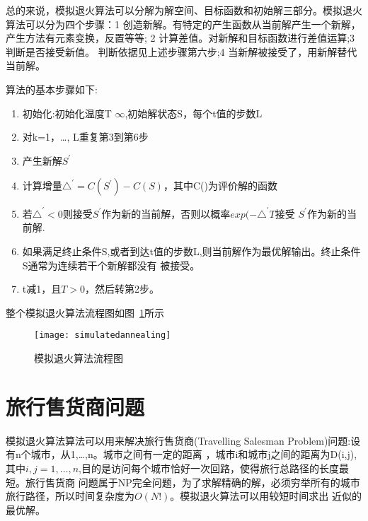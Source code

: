     总的来说，模拟退火算法可以分解为解空间、目标函数和初始解三部分。模拟退火算法可以分为四个步骤：1 创造新解。有特定的产生函数从当前解产生一个新解，产生方法有元素变换，反置等等; 2
计算差值。对新解和目标函数进行差值运算;3 判断是否接受新值。 判断依据见上述步骤第六步;4 当新解被接受了，用新解替代当前解。

    算法的基本步骤如下:
\begin{enumerate}
\item  初始化:初始化温度T $\infty$,初始解状态S，每个t值的步数L
\item  对k=1，\ldots, L重复第3到第6步
\item  产生新解$S^{'}$
\item  计算增量$\triangle^{'}=C(S^{'})-C(S)$，其中C()为评价解的函数
\item  若$\triangle^{'}<0$则接受$S^{'}$作为新的当前解，否则以概率$exp(-\triangle^{'}T$接受
$S^{'}$作为新的当前解.
\item  如果满足终止条件S,或者到达t值的步数L,则当前解作为最优解输出。终止条件S通常为连续若干个新解都没有
被接受。
\item  t减1，且$T>0$，然后转第2步。
\end{enumerate}

整个模拟退火算法流程图如图~\ref{fig:simulatedannealing}所示

\begin{figure}[htbp]
\centering
\texttt{[image: simulatedannealing]}
\caption{模拟退火算法流程图}\label{fig:simulatedannealing}
\vspace{\baselineskip}
\end{figure}


\section{旅行售货商问题}
    模拟退火算法算法可以用来解决旅行售货商(Travelling Salesman Problem)问题:设有n个城市，从1,\ldots,n。城市之间有一定的距离
，城市i和城市j之间的距离为D(i,j),其中$i,j=1,\ldots,n$,目的是访问每个城市恰好一次回路，使得旅行总路径的长度最短。旅行售货商
问题属于NP完全问题，为了求解精确的解，必须穷举所有的城市旅行路径，所以时间复杂度为$O(N!)$。模拟退火算法可以用较短时间求出
近似的最优解\cite{Xuzhihong}。

